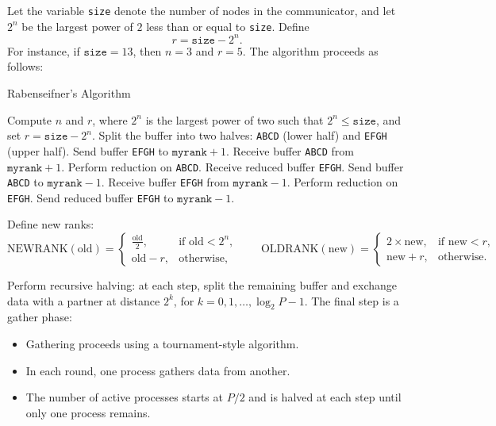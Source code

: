 \documentclass[12pt]{book}
\begin{document}
Let the variable \texttt{size} denote the number of nodes in the communicator, 
and let $2^n$ be the largest power of $2$ less than or equal to \texttt{size}. 
Define 
\[
r = \texttt{size} - 2^n.
\]
For instance, if $\texttt{size} = 13$, then $n=3$ and $r=5$. The algorithm proceeds as follows:
\begin{algorithm}[H]
\caption{Rabenseifner's Algorithm}
\label{alg:rabenseifner}
\begin{algorithmic}[1]
\State Compute $n$ and $r$, where $2^n$ is the largest power of two such that $2^n \leq \texttt{size}$, and set $r = \texttt{size} - 2^n$.
    \State Split the buffer into two halves: \texttt{ABCD} (lower half) and \texttt{EFGH} (upper half).
        \State Send buffer \texttt{EFGH} to $\texttt{myrank}+1$.
        \State Receive buffer \texttt{ABCD} from $\texttt{myrank}+1$.
        \State Perform reduction on \texttt{ABCD}.
        \State Receive reduced buffer \texttt{EFGH}.
    \Else {}
        \State Send buffer \texttt{ABCD} to $\texttt{myrank}-1$.
        \State Receive buffer \texttt{EFGH} from $\texttt{myrank}-1$.
        \State Perform reduction on \texttt{EFGH}.
        \State Send reduced buffer \texttt{EFGH} to $\texttt{myrank}-1$.
    \EndIf
\EndIf

\State Define new ranks:
\[
\text{NEWRANK}(\text{old}) =
\begin{cases}
\frac{\text{old}}{2}, & \text{if } \text{old}<2^n,\\
\text{old}-r, & \text{otherwise},
\end{cases}
\qquad
\text{OLDRANK}(\text{new}) =
\begin{cases}
2\times \text{new}, & \text{if } \text{new}<r,\\
\text{new}+r, & \text{otherwise}.
\end{cases}
\]

\State Perform recursive halving: at each step, split the remaining buffer and exchange data with a partner at distance $2^k$, for $k=0,1,\ldots,\log_2 P -1$.
\State The final step is a gather phase:
\begin{itemize}
    \item Gathering proceeds using a tournament-style algorithm.
    \item In each round, one process gathers data from another.
    \item The number of active processes starts at $P/2$ and is halved at each step until only one process remains.
\end{itemize}
\end{algorithmic}
\end{algorithm}
\end{document}

